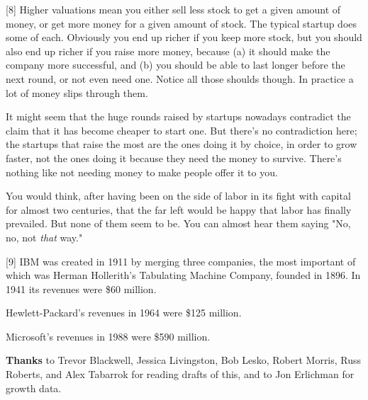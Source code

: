 [8] Higher valuations mean you either sell less stock to get a
                  given amount of money, or get more money for a given amount of
                  stock. The typical startup does some of each. Obviously you
                  end up richer if you keep more stock, but you should also end
                  up richer if you raise more money, because (a) it should make
                  the company more successful, and (b) you should be able to
                  last longer before the next round, or not even need one.
                  Notice all those shoulds though. In practice a lot of money
                  slips through them.

It might seem that the huge
                  rounds raised by startups nowadays contradict the claim that
                  it has become cheaper to start one. But there's no
                  contradiction here; the startups that raise the most are the
                  ones doing it by choice, in order to grow faster, not the ones
                  doing it because they need the money to survive. There's
                  nothing like not needing money to make people offer it to
                  you.

You would think, after having been on the side
                  of labor in its fight with capital for almost two centuries,
                  that the far left would be happy that labor has finally
                  prevailed. But none of them seem to be. You can almost hear
                  them saying "No, no, not \emph{that} way."

[9] IBM was created in 1911 by merging three companies, the
                  most important of which was Herman Hollerith's Tabulating
                  Machine Company, founded in 1896. In 1941 its revenues were
                  \$60 million.

Hewlett-Packard's revenues in 1964
                  were \$125 million.

Microsoft's revenues in 1988
                  were \$590 million.



\textbf{Thanks} to
                  Trevor Blackwell, Jessica Livingston, Bob Lesko, Robert
                  Morris, Russ Roberts, and Alex Tabarrok for reading drafts of
                  this, and to Jon Erlichman for growth data.


              
            
          
            
              
                


                  
              
            
          
